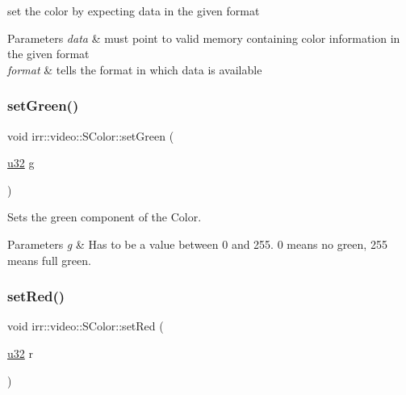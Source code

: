 set the color by expecting data in the given format 


\begin{DoxyParams}{Parameters}
{\em data} & must point to valid memory containing color information in the given format \\
\hline
{\em format} & tells the format in which data is available \\
\hline
\end{DoxyParams}
\mbox{\label{classirr_1_1video_1_1SColor_af80cfedd5e761216b8bed259963ac948}} 
\subsubsection{\texorpdfstring{set\+Green()}{setGreen()}}
{\footnotesize\ttfamily void irr\+::video\+::\+S\+Color\+::set\+Green (\begin{DoxyParamCaption}\item[{\hyperlink{namespaceirr_a0416a53257075833e7002efd0a18e804}{u32}}]{g }\end{DoxyParamCaption})\hspace{0.3cm}{\ttfamily [inline]}}



Sets the green component of the Color. 


\begin{DoxyParams}{Parameters}
{\em g} & Has to be a value between 0 and 255. 0 means no green, 255 means full green. \\
\hline
\end{DoxyParams}
\mbox{\label{classirr_1_1video_1_1SColor_a950c98714711ae9dd8c5219f83c07693}} 
\subsubsection{\texorpdfstring{set\+Red()}{setRed()}}
{\footnotesize\ttfamily void irr\+::video\+::\+S\+Color\+::set\+Red (\begin{DoxyParamCaption}\item[{\hyperlink{namespaceirr_a0416a53257075833e7002efd0a18e804}{u32}}]{r }\end{DoxyParamCaption})\hspace{0.3cm}{\ttfamily [inline]}}



